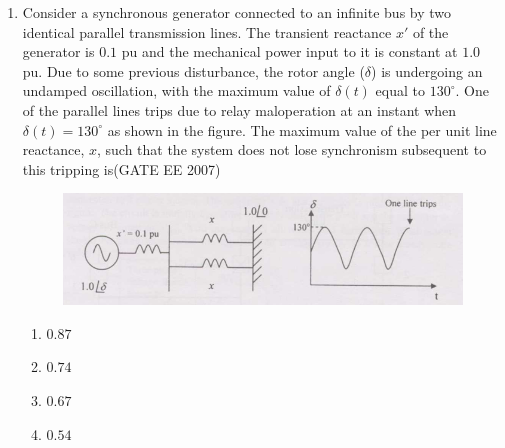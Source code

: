 \documentclass[a4paper,10pt]{exam}
\theoremstyle{remark}
\begin{document}
\begin{enumerate}
$
\text{If}\ R = 
\myvec{
v_{an} & v_{bn} & v_{cn}
}
\myvec{
0 & \frac{1}{\sqrt{3}} & -\frac{1}{\sqrt{3}} \\
-\frac{1}{\sqrt{3}} & 0 & \frac{1}{\sqrt{3}} \\
\frac{1}{\sqrt{3}} & -\frac{1}{\sqrt{3}} & 0
}
\myvec{
i_a \\ i_b \\ i_c
},\ 
\text{then the magnitude of $R$ is}
$


\vspace{1cm}
\begin{multicols}{4}
\begin{enumerate}
\item  $3VI$
\item  $VI$
\item  $0.7VI$
\item  $0$
\end{enumerate}
\end{multicols}

\vfill
{}
\newpage

\item  \quad
Consider a synchronous generator connected to an infinite bus by two identical parallel transmission lines. The transient reactance $x'$ of the generator is $0.1$ pu and the mechanical power input to it is constant at $1.0$ pu. Due to some previous disturbance, the rotor angle ($\delta$) is undergoing an undamped oscillation, with the maximum value of $\delta(t)$ equal to $130^\circ$. One of the parallel lines trips due to relay maloperation at an instant when $\delta(t) = 130^\circ$ as shown in the figure. The maximum value of the per unit line reactance, $x$, such that the system does not lose synchronism subsequent to this tripping is\hfill{(GATE EE 2007)} 

\begin{figure}[H]
    \centering
    \includegraphics[width=0.7\linewidth]{figs/Q 30 2007.png}
\end{figure}

\begin{multicols}{4}
\begin{enumerate}
\item  $0.87$
\item  $0.74$
\item  $0.67$
\item  $0.54$
\end{enumerate}
\end{multicols}


\end{enumerate}
\end{document}
